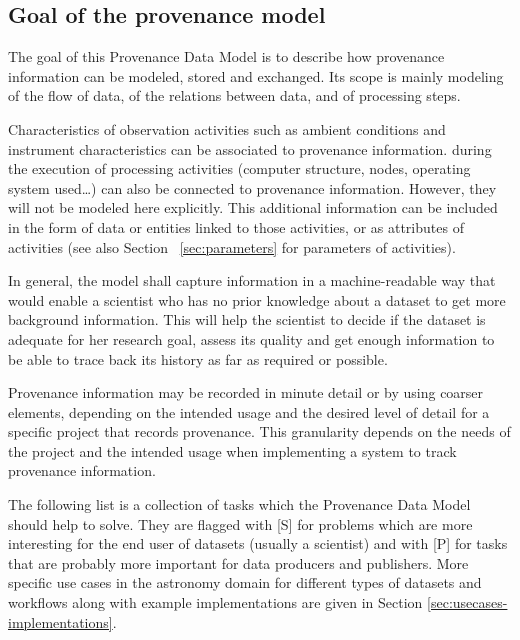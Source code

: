 

\subsection{Goal of the provenance model}\label{sec:goals}

The goal of this Provenance Data Model is to describe how provenance information
can be modeled, stored and exchanged. Its scope
is mainly modeling of the flow of data, of the relations between data,
and of processing steps. 

Characteristics of observation activities such as ambient conditions and instrument characteristics can be associated to provenance information.  during the execution of processing activities (computer structure, nodes, operating system used\dots) can also be connected to provenance information. However, they will not be modeled here explicitly. This additional information can be included in the form of data or entities linked to those activities, or as attributes of activities (see also Section ~\ref{sec:parameters} for parameters of activities).

In general, the model shall capture information in a machine-readable way that would enable a scientist who has no prior knowledge about a dataset to get more background information. 
This will help the scientist to decide if the dataset 
is adequate for her research goal, assess its quality and get enough information
to be able to trace back its history as far as required or possible. 

Provenance information may be recorded in minute detail or by using coarser
elements, depending on the intended usage and the desired level of detail
for a specific project that records provenance. 
This granularity depends on the needs of the project and the intended usage when implementing a system to track provenance information.

The following list is a collection of tasks which the Provenance Data Model should help to solve. They are flagged with [S] for problems which are more interesting for the end user of datasets (usually a scientist) and with [P] for tasks that are probably more important for data producers and publishers.
More specific use cases in the astronomy domain for different types of datasets and workflows along with example implementations are given in Section \ref{sec:usecases-implementations}.


